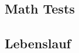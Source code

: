 \documentclass[11pt, a4paper, twoside]{book}
\begin{document}

\begin{refsection}

\chapter{Math Tests}

	{\setlength{\parindent}{0cm}
	
	
	
	\renewcommand{\showfamily}{{\color{magenta}%
		Serif%
	}}
	{\rmfamily\mdseries}
	
	\renewcommand{\showfamily}{{\color{magenta}%
		Serif Bold%
	}}
	{\rmfamily\bfseries}
	
	\renewcommand{\showfamily}{{\color{magenta}%
		Sans Serif%
	}}
	{\sffamily\mdseries}
	
	\renewcommand{\showfamily}{{\color{magenta}%
		Sans Serif Bold%
	}}
	{\sffamily\bfseries}
}

\end{refsection}





\begin{refsection}


\chapter*{%
	Lebenslauf%
}


\end{refsection}
\end{document}
